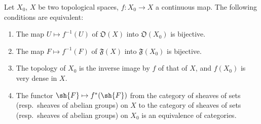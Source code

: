 \begin{proposition}[10.2.1]
\label{IV.10.2.1}
Let $X_0$, $X$ be two topological spaces, $f:X_0\to X$ a continuous map.
The following conditions are equivalent:
\begin{enumerate}[label=\emph{\alph*)}]
  \item The map $U\mapsto f^{-1}(U)$ of $\mathfrak{O}(X)$ into $\mathfrak{O}(X_0)$ is bijective.
  \item[\rm a$'$)] The map $F\mapsto f^{-1}(F)$ of $\mathfrak{F}(X)$ into $\mathfrak{F}(X_0)$ is bijective.
  \item The topology of $X_0$ is the inverse image by $f$ of that of $X$, and $f(X_0)$ is very dense  in $X$.
  \item The functor $\sh{F}\mapsto f^*(\sh{F})$ from the category of sheaves of sets (resp.\ sheaves of abelian groups) on $X$ to the category of sheaves of sets (resp.\ sheaves of abelian groups) on $X_0$ is an equivalence of categories.
\end{enumerate}
\end{proposition}

